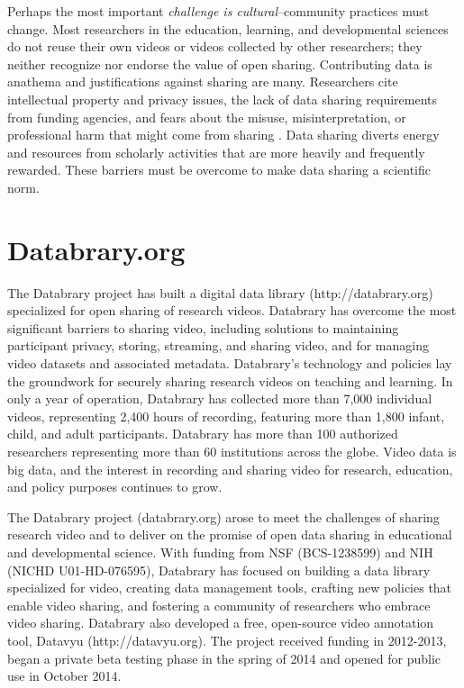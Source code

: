 \documentclass[letterpaper,man,apacite]{apa6}
\begin{document}
Perhaps the most important \emph{challenge is cultural}--community practices must change. 
Most researchers in the education, learning, and developmental sciences do not reuse their own videos or videos collected by other researchers; they neither recognize nor endorse the value of open sharing. 
Contributing data is anathema and justifications against sharing are many. 
Researchers cite intellectual property and privacy issues, the lack of data sharing requirements from funding agencies, and fears about the misuse, misinterpretation, or professional harm that might come from sharing \cite{Ascoli2006b,Ferguson2014}. 
Data sharing diverts energy and resources from scholarly activities that are more heavily and frequently rewarded. 
These barriers must be overcome to make data sharing a scientific norm. 

\section{Databrary.org}
The Databrary project has built a digital data library (http://databrary.org) specialized for open sharing of research videos. 
Databrary has overcome the most significant barriers to sharing video, including solutions to maintaining participant privacy, storing, streaming, and sharing video, and for managing video datasets and associated metadata. 
Databrary's technology and policies lay the groundwork for securely sharing research videos on teaching and learning. 
In only a year of operation, Databrary has collected more than 7,000 individual videos, representing 2,400 hours of recording, featuring more than 1,800 infant, child, and adult participants. 
Databrary has more than 100 authorized researchers representing more than 60 institutions across the globe. 
Video data is big data, and the interest in recording and sharing video for research, education, and policy purposes continues to grow.

The Databrary project (databrary.org) arose to meet the challenges of sharing research video and to deliver on the promise of open data sharing in educational and developmental science. 
With funding from NSF (BCS-1238599) and NIH (NICHD U01-HD-076595), Databrary has focused on building a data library specialized for video, creating data management tools, crafting new policies that enable video sharing, and fostering a community of researchers who embrace video sharing. 
Databrary also developed a free, open-source video annotation tool, Datavyu (http://datavyu.org). 
The project received funding in 2012-2013, began a private beta testing phase in the spring of 2014 and opened for public use in October 2014.
\end{document}
